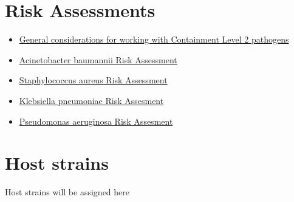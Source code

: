\documentclass[
]{book}
\providecommand{\tightlist}{%
  \setlength{\itemsep}{0pt}\setlength{\parskip}{0pt}}
\begin{document}
\hypertarget{risk-assessment}{%
\chapter{Risk Assessments}\label{risk-assessment}}

\begin{itemize}
\tightlist
\item
  \href{RA/CL2-RA.pdf}{General considerations for working with Containment Level 2 pathogens}
\item
  \href{RA/Acinetobacter-RA.pdf}{Acinetobacter baumannii Risk Assessment}
\item
  \href{RA/Staphylococcus-RA.pdf}{Staphylococcus aureus Risk Assessment}
\item
  \href{RA/Klebisella-RA.pdf}{Klebsiella pneumoniae Risk Assesment}
\item
  \href{RA/Pseudomonas-RA.pdf}{Pseudomonas aeruginosa Risk Assesment}
\end{itemize}

\hypertarget{host-strains}{%
\chapter*{Host strains}\label{host-strains}}

Host strains will be assigned here

  
\end{document}
